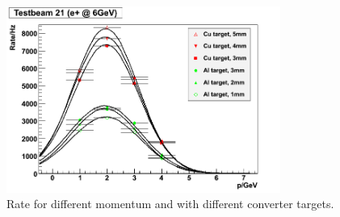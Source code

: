     \begin{figure}[!h]
      \centering
      \includegraphics[width = 0.8\textwidth]{Pictures/X0/rate_vs_p_t21.png}
      \caption{Rate for different momentum and with different converter targets\cite{DESYII}.}
      \label{fig:rateTB21}
    \end{figure}


